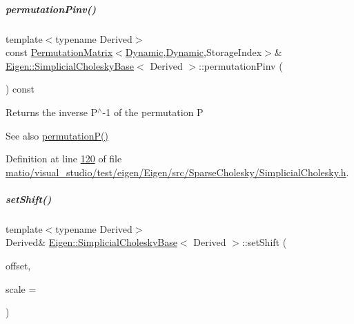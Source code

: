 \mbox{\label{group___sparse_cholesky___module_a0e23d1f4a88c211be7098faf1cb41674}} 
\subparagraph{\texorpdfstring{permutation\+Pinv()}{permutationPinv()}\hspace{0.1cm}{\footnotesize\ttfamily [2/2]}}
{\footnotesize\ttfamily template$<$typename Derived$>$ \\
const \hyperlink{group___core___module_class_eigen_1_1_permutation_matrix}{Permutation\+Matrix}$<$\hyperlink{namespace_eigen_ad81fa7195215a0ce30017dfac309f0b2}{Dynamic},\hyperlink{namespace_eigen_ad81fa7195215a0ce30017dfac309f0b2}{Dynamic},Storage\+Index$>$\& \hyperlink{group___sparse_cholesky___module_class_eigen_1_1_simplicial_cholesky_base}{Eigen\+::\+Simplicial\+Cholesky\+Base}$<$ Derived $>$\+::permutation\+Pinv (\begin{DoxyParamCaption}{ }\end{DoxyParamCaption}) const\hspace{0.3cm}{\ttfamily [inline]}}

\begin{DoxyReturn}{Returns}
the inverse P$^\wedge$-\/1 of the permutation P 
\end{DoxyReturn}
\begin{DoxySeeAlso}{See also}
\hyperlink{group___sparse_cholesky___module_aff1480e595a21726beaec9a586a94d5a}{permutation\+P()} 
\end{DoxySeeAlso}


Definition at line \hyperlink{matio_2visual__studio_2test_2eigen_2_eigen_2src_2_sparse_cholesky_2_simplicial_cholesky_8h_source_l00120}{120} of file \hyperlink{matio_2visual__studio_2test_2eigen_2_eigen_2src_2_sparse_cholesky_2_simplicial_cholesky_8h_source}{matio/visual\+\_\+studio/test/eigen/\+Eigen/src/\+Sparse\+Cholesky/\+Simplicial\+Cholesky.\+h}.

\mbox{\label{group___sparse_cholesky___module_a362352f755101faaac59c1ed9d5e3559}} 
\subparagraph{\texorpdfstring{set\+Shift()}{setShift()}\hspace{0.1cm}{\footnotesize\ttfamily [1/2]}}
{\footnotesize\ttfamily template$<$typename Derived$>$ \\
Derived\& \hyperlink{group___sparse_cholesky___module_class_eigen_1_1_simplicial_cholesky_base}{Eigen\+::\+Simplicial\+Cholesky\+Base}$<$ Derived $>$\+::set\+Shift (\begin{DoxyParamCaption}\item[{const Real\+Scalar \&}]{offset,  }\item[{const Real\+Scalar \&}]{scale = {} }\end{DoxyParamCaption})\hspace{0.3cm}{\ttfamily [inline]}}

